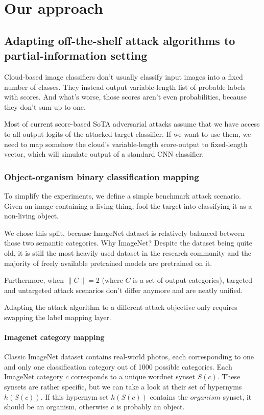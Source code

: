 \chapter{Our approach}

\section{Adapting off-the-shelf attack algorithms to partial-information setting}
Cloud-based image classifiers don't usually classify input images into a fixed number of classes. They instead output variable-length list of probable labels with scores. And what's worse, those scores aren't even probabilities, because they don't sum up to one. 

Most of current score-based SoTA adversarial attacks assume that we have access to all output logits of the attacked target classifier. If we want to use them, we need to map somehow the cloud's variable-length score-output to fixed-length vector, which will simulate output of a standard CNN classifier.

\subsection{Object-organism binary classification mapping}
To simplify the experiments, we define a simple benchmark attack scenario. Given an image containing a living thing, fool the target into classifying it as a non-living object.

We chose this split, because ImageNet dataset is relatively balanced between those two semantic categories. Why ImageNet? Despite the dataset being quite old, it is still the most heavily used dataset in the research community and the majority of freely available pretrained models are pretrained on it.

Furthermore, when $\|C\| = 2$ (where $C$ is a set of output categories), targeted and untargeted attack scenarios don't differ anymore and are neatly unified.

Adapting the attack algorithm to a different attack objective only requires swapping the label mapping layer.

\subsubsection{Imagenet category mapping}
Classic ImageNet dataset contains real-world photos, each corresponding to one and only one classification category out of 1000 possible categories. Each ImageNet category $c$ corresponds to a unique wordnet synset $S(c)$. These synsets are rather specific, but we can take a look at their set of hypernyms $h(S(c))$. If this hypernym set $h(S(c))$ contains the $organism$ synset, it should be an organism, otherwise $c$ is probably an object. 


